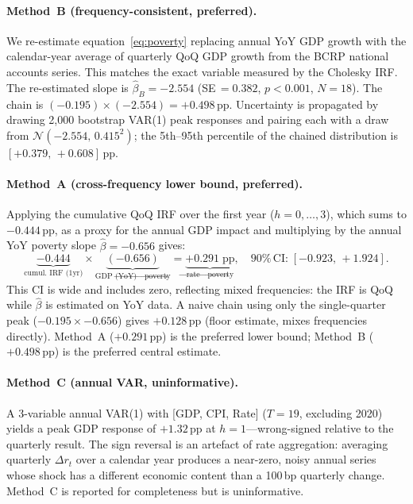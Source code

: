 \documentclass[12pt,letterpaper]{article}
\begin{document}
\paragraph{Method~B (frequency-consistent, preferred).}
We re-estimate equation~\eqref{eq:poverty} replacing annual YoY GDP
growth with the calendar-year average of quarterly QoQ GDP growth from the
BCRP national accounts series. This matches the exact variable measured
by the Cholesky IRF. The re-estimated slope is $\hat\beta_B=-2.554$
(SE$\,=0.382$, $p<0.001$, $N=18$). The chain is
$(-0.195)\times(-2.554)=+0.498$\,pp. Uncertainty is propagated by
drawing 2,000 bootstrap VAR(1) peak responses and pairing each with a
draw from $\mathcal{N}(-2.554,\,0.415^2)$; the 5th--95th percentile
of the chained distribution is $[+0.379,\,+0.608]$\,pp.

\paragraph{Method~A (cross-frequency lower bound, preferred).}
Applying the cumulative QoQ IRF over the first year ($h=0,\ldots,3$),
which sums to $-0.444$\,pp, as a proxy for the annual GDP impact and
multiplying by the annual YoY poverty slope $\hat\beta=-0.656$ gives:
\begin{equation}
  \label{eq:chain_A}
  \underbrace{-0.444}_{\text{cumul.\ IRF (1yr)}} \times
  \underbrace{(-0.656)}_{\text{GDP (YoY)}\to\text{poverty}} =
  \underbrace{+0.291\;\text{pp}}_{\text{rate}\to\text{poverty}},
  \quad 90\%\,\text{CI:}\;[-0.923,\,+1.924].
\end{equation}
This CI is wide and includes zero, reflecting mixed frequencies: the
IRF is QoQ while $\hat\beta$ is estimated on YoY data.
A naive chain using only the single-quarter peak ($-0.195\times-0.656$)
gives $+0.128$\,pp (floor estimate, mixes frequencies directly).
Method~A ($+0.291$\,pp) is the preferred lower bound; Method~B
($+0.498$\,pp) is the preferred central estimate.

\paragraph{Method~C (annual VAR, uninformative).}
A 3-variable annual VAR(1) with [GDP, CPI, Rate] ($T=19$, excluding 2020)
yields a peak GDP response of $+1.32$\,pp at $h=1$---wrong-signed relative
to the quarterly result. The sign reversal is an artefact of rate
aggregation: averaging quarterly $\Delta r_t$ over a calendar year
produces a near-zero, noisy annual series whose shock has a different
economic content than a 100\,bp quarterly change. Method~C is reported
for completeness but is uninformative.
\end{document}
